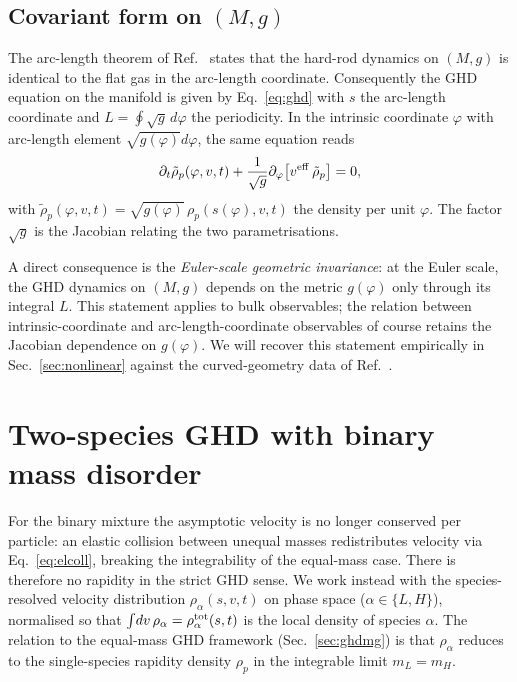 \documentclass[aps,pre,twocolumn,superscriptaddress,longbibliography,floatfix]{revtex4-2}
\begin{document}
\subsection{Covariant form on $(M,g)$}

The arc-length theorem of Ref.~\cite{PaperI} states that the
hard-rod dynamics on $(M,g)$ is identical to the flat gas in the
arc-length coordinate. Consequently the GHD equation on the
manifold is given by Eq.~\eqref{eq:ghd} with $s$ the arc-length
coordinate and $L=\oint\sqrt{g}\,d\varphi$ the periodicity. In
the intrinsic coordinate $\varphi$ with arc-length element
$\sqrt{g(\varphi)}d\varphi$, the same equation reads
\begin{equation}
\partial_t \tilde\rho_p(\varphi,v,t)
+ \frac{1}{\sqrt{g}}\partial_\varphi\!\left[v^{\rm eff}\,\tilde\rho_p\right]
= 0,
\label{eq:ghdmg}
\end{equation}
with $\tilde\rho_p(\varphi,v,t) = \sqrt{g(\varphi)}\,\rho_p(s(\varphi),v,t)$
the density per unit $\varphi$. The factor $\sqrt{g}$ is the
Jacobian relating the two parametrisations.

A direct consequence is the
\emph{Euler-scale geometric invariance}: at the Euler scale, the
GHD dynamics on $(M,g)$ depends on the metric $g(\varphi)$ only
through its integral $L$. This statement applies to bulk
observables; the relation between intrinsic-coordinate and
arc-length-coordinate observables of course retains the
Jacobian dependence on $g(\varphi)$. We will recover this
statement empirically in
Sec.~\ref{sec:nonlinear} against the curved-geometry data of
Ref.~\cite{PaperIII}.

\section{Two-species GHD with binary mass disorder}
\label{sec:twospecies}

For the binary mixture the asymptotic velocity is no longer
conserved per particle: an elastic collision between unequal
masses redistributes velocity via Eq.~\eqref{eq:elcoll},
breaking the integrability of the equal-mass case. There is
therefore no rapidity in the strict GHD sense. We work instead
with the species-resolved velocity distribution
$\rho_\alpha(s,v,t)$ on phase space ($\alpha\in\{L,H\}$),
normalised so that $\int\!dv\,\rho_\alpha = \rho_\alpha^{\rm
tot}(s,t)$ is the local density of species $\alpha$. The
relation to the equal-mass GHD framework
(Sec.~\ref{sec:ghdmg}) is that $\rho_\alpha$ reduces to the
single-species rapidity density $\rho_p$ in the integrable
limit $m_L=m_H$.
\end{document}
